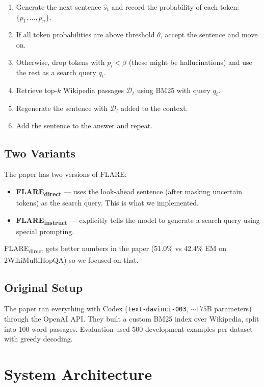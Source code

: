 \documentclass[conference]{IEEEtran}
\begin{document}
\begin{enumerate}[leftmargin=*, itemsep=2pt]
  \item Generate the next sentence $\hat{s}_t$ and record the
    probability of each token: $\{p_1, \ldots, p_n\}$.
  \item If all token probabilities are above threshold $\theta$,
    accept the sentence and move on.
  \item Otherwise, drop tokens with $p_i < \beta$ (these might be
    hallucinations) and use the rest as a search query $q_t$.
  \item Retrieve top-$k$ Wikipedia passages $\mathcal{D}_t$ using
    BM25 with query $q_t$.
  \item Regenerate the sentence with $\mathcal{D}_t$ added to the
    context.
  \item Add the sentence to the answer and repeat.
\end{enumerate}

\subsection{Two Variants}
The paper has two versions of FLARE:
\begin{itemize}[leftmargin=*]
  \item \textbf{FLARE\textsubscript{direct}} — uses the look-ahead
    sentence (after masking uncertain tokens) as the search query.
    This is what we implemented.
  \item \textbf{FLARE\textsubscript{instruct}} — explicitly tells
    the model to generate a search query using special prompting.
\end{itemize}
FLARE\textsubscript{direct} gets better numbers in the paper
(51.0\% vs 42.4\% EM on 2WikiMultiHopQA) so we focused on that.

\subsection{Original Setup}
The paper ran everything with Codex (\texttt{text-davinci-003},
${\sim}175$B parameters) through the OpenAI API. They built a custom
BM25 index over Wikipedia, split into 100-word passages. Evaluation
used 500 development examples per dataset with greedy decoding.

\section{System Architecture}
\label{sec:architecture}
\end{document}

